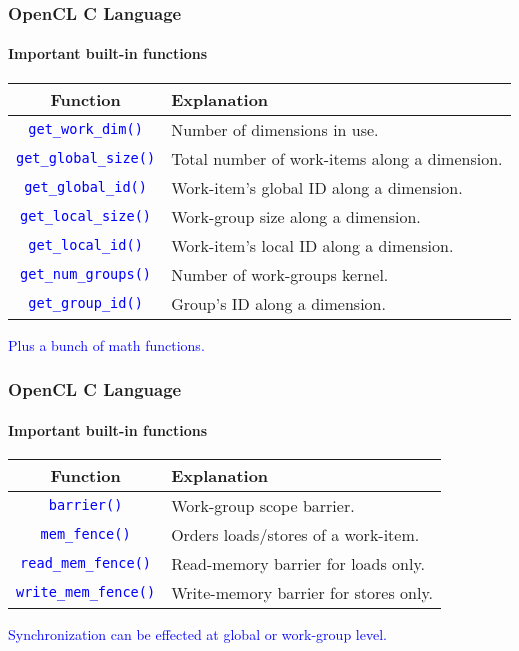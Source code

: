\documentclass{beamer}
\newcommand{\func}[1]{\lstinline[basicstyle=\sffamily]{#1()}}
\newcommand{\tablefont}{\fontsize{8}{13}\selectfont}
\begin{document}
\begin{frame}
\frametitle{OpenCL C Language}
\framesubtitle{Important built-in functions}

  \tablefont

  \begin{center}
  \begin{tabular}{|c|l|}
  \hline
  Function & Explanation \\
  \hline
  \textcolor{blue}{\func{get_work_dim}} & Number of dimensions in use. \\
  \hline
  \textcolor{blue}{\func{get_global_size}} & Total number of work-items along a dimension. \\
  \hline
  \textcolor{blue}{\func{get_global_id}} & Work-item's global ID along a dimension. \\
  \hline
  \textcolor{blue}{\func{get_local_size}} & Work-group size along a dimension. \\
  \hline
  \textcolor{blue}{\func{get_local_id}} & Work-item's local ID along a dimension. \\
  \hline
  \textcolor{blue}{\func{get_num_groups}} & Number of work-groups kernel. \\
  \hline
  \textcolor{blue}{\func{get_group_id}} & Group's ID along a dimension. \\
  \hline
  \end{tabular}
  \end{center}

  \normalsize

  \begin{center}
\textcolor{blue}{Plus a bunch of math functions.}
  \end{center}
  
\end{frame}

\begin{frame}
\frametitle{OpenCL C Language}
\framesubtitle{Important built-in functions}

  \tablefont

  \begin{center}
  \begin{tabular}{|c|l|}
  \hline
  Function & Explanation \\
  \hline
  \textcolor{blue}{\func{barrier}} & Work-group scope barrier.\\
  \hline
  \textcolor{blue}{\func{mem_fence}} & Orders loads/stores of a work-item.\\
  \hline
  \textcolor{blue}{\func{read_mem_fence}} & Read-memory barrier for loads only.\\
  \hline
  \textcolor{blue}{\func{write_mem_fence}} & Write-memory barrier for stores only. \\
  \hline
  \end{tabular}
  \end{center}

  \normalsize

  \begin{center}
\textcolor{blue}{Synchronization can be effected at global or work-group level.}
  \end{center}
  
\end{frame}
\end{document}
